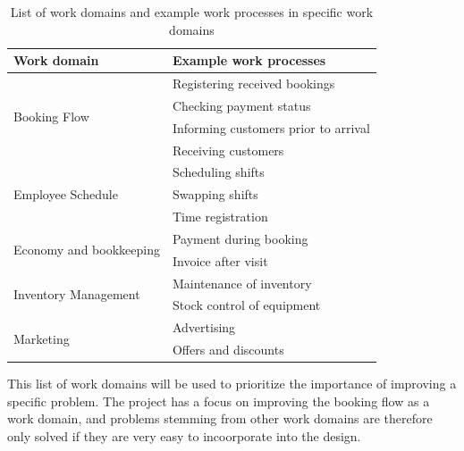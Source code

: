 \begin{table}[H]
    \centering
\begin{tabular}{ |l|l| }
        \hline
        Work domain & Example work processes \\ \hline
        \multirow{4}{*}{Booking Flow} 
            & Registering received bookings \\
            & Checking payment status \\
            & Informing customers prior to arrival \\
            & Receiving customers \\
        \hline
        \multirow{3}{*}{Employee Schedule} 
            & Scheduling shifts \\
            & Swapping shifts \\
            & Time registration \\
        \hline
        \multirow{2}{*}{Economy and bookkeeping} 
            & Payment during booking \\
            & Invoice after visit \\
        \hline
        \multirow{2}{*}{Inventory Management} 
            & Maintenance of inventory \\
            & Stock control of equipment \\
        \hline
        \multirow{2}{*}{Marketing} 
            & Advertising \\
            & Offers and discounts \\
        \hline
\end{tabular}
\caption{List of work domains and example work processes in specific work domains}
\label{table:workdomain}
\end{table}

This list of work domains will be used to prioritize the importance of 
improving a specific problem. The project has a focus on improving the booking flow 
as a work domain, and problems stemming from other work domains are therefore only 
solved if they are very easy to incoorporate into the design.


